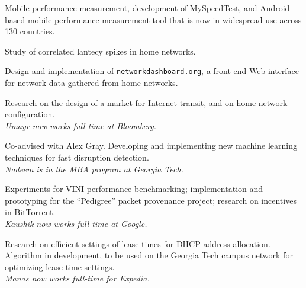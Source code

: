 \begin{description}

{Mobile performance measurement, development of MySpeedTest, and
  Android-based mobile performance measurement tool that is now in
  widespread use across 130 countries.}

{Study of correlated lantecy spikes in home networks.}

{Design and implementation of {\tt networkdashboard.org}, a front end
  Web interface for network data gathered from home networks.}



{Research on the design of a market for Internet transit, and on home
  network configuration. \\ {\em Umayr now works full-time at Bloomberg.}}

 {
   } {Co-advised with Alex Gray.
  Developing and implementing new machine learning techniques for fast
  disruption detection. \\ {\em Nadeem is in the MBA program at Georgia
    Tech.}}

{Experiments for VINI performance benchmarking; implementation and
  prototyping for the ``Pedigree'' packet provenance project; research
  on incentives in BitTorrent. \\ {\em Kaushik now works full-time at Google.}}



{}{Research on efficient settings of lease
times for DHCP address allocation.  Algorithm in development, to be used
on the Georgia Tech campus network for optimizing lease time
settings. \\ {\em Manas now works full-time for Expedia.}}


\end{description}
